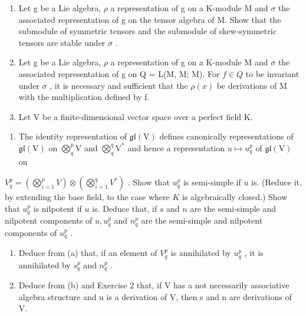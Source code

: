 
\begin{enumerate}
\def\labelenumi{\arabic{enumi}.}
\item
  Let g be a Lie algebra, \(\rho\) a representation of g on a K-module M and \(\sigma\) the associated representation of g on the tensor algebra of M. Show that the submodule of symmetric tensors and the submodule of skew-symmetric tensors are stable under \(\sigma\) .
\item
  Let g be a Lie algebra, \(\rho\) a representation of g on a K-module M and \(\sigma\) the associated representation of g on Q = L(M, M; M). For \(f \in Q\) to be invariant under \(\sigma\) , it is necessary and sufficient that the \(\rho(x)\) be derivations of M with the multiplication defined by f.
\item
  Let V be a finite-dimensional vector space over a perfect field K.
\end{enumerate}

\begin{enumerate}
\def\labelenumi{(\alph{enumi})}
\tightlist
\item
  The identity representation of \(\mathfrak{gl}(\mathrm{V})\) defines canonically representations of \(\mathfrak{gl}(\mathrm{V})\) on \(\bigotimes_{q}^{p}\mathrm{V}\) and \(\bigotimes_{q}^{q}\mathrm{V}^{*}\) and hence a representation \(u\mapsto u_q^p\) of \(\mathfrak{gl}(\mathrm{V})\) on
\end{enumerate}

\(V_{q}^{p} = \left( \bigotimes_{i=1}^{p} V \right) \otimes \left( \bigotimes_{i=1}^{q} V^{*} \right)\) . Show that \(u_{q}^{p}\) is semi-simple if \(u\) is. (Reduce it, by extending the base field, to the case where \(K\) is algebraically closed.) Show that \(u_{q}^{p}\) is nilpotent if \(u\) is. Deduce that, if \(s\) and \(n\) are the semi-simple and nilpotent components of \(u, u_{q}^{p}\) and \(n_{q}^{p}\) are the semi-simple and nilpotent components of \(u_{q}^{p}\) .

\begin{enumerate}
\def\labelenumi{(\alph{enumi})}
\setcounter{enumi}{1}
\item
  Deduce from (a) that, if an element of \(V_q^p\) is annihilated by \(u_q^p\) , it is annihilated by \(s_q^p\) and \(n_q^p\) .
\item
  Deduce from (b) and Exercise 2 that, if V has a not necessarily associative algebra structure and u is a derivation of V, then s and n are derivations of V.
\end{enumerate}

